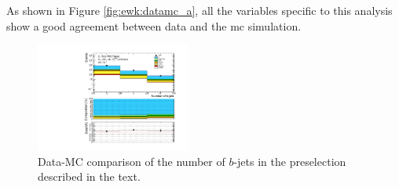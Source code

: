 As shown in Figure \ref{fig:ewk:datamc_a}, all the variables specific to this analysis show a good 
agreement between data and the \gls{mc} simulation. 

\begin{figure}[htbp]
\centering 
\includegraphics[width=0.45\textwidth]{figures/ewk_prod/data_mc/0L_3bin/data_mc_bjets_n.pdf}
\caption{Data-MC comparison of the number of $b$-jets in the preselection described in the text.
}
\label{fig:ewk:datamc_bjets}
\end{figure}

